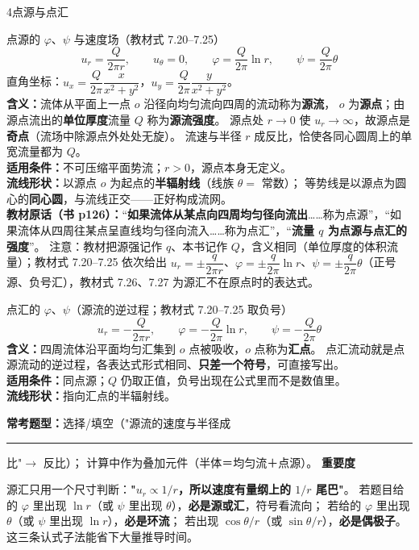 \begin{kaodian}{4}{点源与点汇}
\begin{gongshi}{点源的 $\varphi$、$\psi$ 与速度场（教材式 7.20--7.25）}
\[ u_r=\frac{Q}{2\pi r},\qquad u_\theta=0,\qquad \varphi=\frac{Q}{2\pi}\ln r,\qquad \psi=\frac{Q}{2\pi}\theta \]
直角坐标：$u_x=\dfrac{Q}{2\pi}\dfrac{x}{x^2+y^2}$，$u_y=\dfrac{Q}{2\pi}\dfrac{y}{x^2+y^2}$。\\
\textbf{含义：}流体从平面上一点 $o$ 沿径向均匀流向四周的流动称为\textbf{源流}，
$o$ 为\textbf{源点}；由源点流出的\textbf{单位厚度}流量 $Q$ 称为\textbf{源流强度}。
源点处 $r\to0$ 使 $u_r\to\infty$，故源点是\textbf{奇点}（流场中除源点外处处无旋）。
流速与半径 $r$ 成反比，恰使各同心圆周上的单宽流量都为 $Q$。\\
\textbf{适用条件：}不可压缩平面势流；$r>0$，源点本身无定义。\\
\textbf{流线形状：}以源点 $o$ 为起点的\textbf{半辐射线}（线族 $\theta=$ 常数）；
等势线是以源点为圆心的\textbf{同心圆}，与流线正交——正好构成流网。\\
\textbf{教材原话（书 p126）：}“\textbf{如果流体从某点向四周均匀径向流出}……称为点源”，“如果流体从四周往某点呈直线均匀径向流入……称为点汇”，“\textbf{流量 $q$ 为点源与点汇的强度}”。
注意：教材把源强记作 $q$、本书记作 $Q$，含义相同（单位厚度的体积流量）；教材式 7.20--7.25 依次给出 $u_r=\pm\dfrac{q}{2\pi r}$、$\varphi=\pm\dfrac{q}{2\pi}\ln r$、$\psi=\pm\dfrac{q}{2\pi}\theta$（正号源、负号汇），教材式 7.26、7.27 为源汇不在原点时的表达式。
\end{gongshi}

\begin{gongshi}{点汇的 $\varphi$、$\psi$（源流的逆过程；教材式 7.20--7.25 取负号）}
\[ u_r=-\frac{Q}{2\pi r},\qquad \varphi=-\frac{Q}{2\pi}\ln r,\qquad \psi=-\frac{Q}{2\pi}\theta \]
\textbf{含义：}四周流体沿平面均匀汇集到 $o$ 点被吸收，$o$ 点称为\textbf{汇点}。
点汇流动就是点源流动的逆过程，各表达式形式相同、\textbf{只差一个符号}，可直接写出。\\
\textbf{适用条件：}同点源；$Q$ 仍取正值，负号出现在公式里而不是数值里。\\
\textbf{流线形状：}指向汇点的半辐射线。
\end{gongshi}
\textbf{常考题型：}选择/填空（"源流的速度与半径成\rule{1.4cm}{0.4pt}比"$\to$ 反比）；
计算中作为叠加元件（半体＝均匀流＋点源）。
\textbf{重要度 }\quad{}\quad{}

\begin{banfa}
源汇只用一个尺寸判断：\textbf{"$u_r\propto 1/r$，所以速度有量纲上的 $1/r$ 尾巴"}。
若题目给的 $\varphi$ 里出现 $\ln r$（或 $\psi$ 里出现 $\theta$），\textbf{必是源或汇}，符号看流向；
若给的 $\varphi$ 里出现 $\theta$（或 $\psi$ 里出现 $\ln r$），\textbf{必是环流}；
若出现 $\cos\theta/r$（或 $\sin\theta/r$），\textbf{必是偶极子}。这三条认式子法能省下大量推导时间。
\end{banfa}
\end{kaodian}

